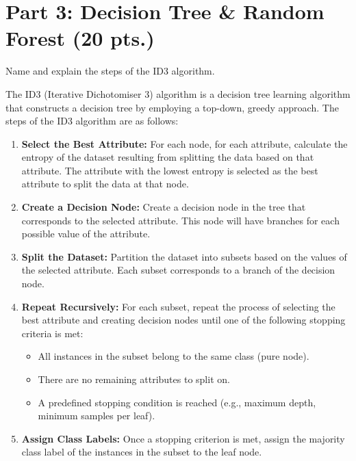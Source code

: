 \documentclass[12pt]{article}
\begin{document}

    \section*{Part 3: Decision Tree \& Random Forest (20 pts.)}

    \begin{ejercicio}
        Name and explain the steps of the ID3 algorithm.

        The ID3 (Iterative Dichotomiser 3) algorithm is a decision tree learning algorithm that constructs a decision tree by employing a top-down, greedy approach. The steps of the ID3 algorithm are as follows:
        \begin{enumerate}
            \item \textbf{Select the Best Attribute:} For each node, for each attribute, calculate the entropy of the dataset resulting from splitting the data based on that attribute. The attribute with the lowest entropy is selected as the best attribute to split the data at that node.
            \item \textbf{Create a Decision Node:} Create a decision node in the tree that corresponds to the selected attribute. This node will have branches for each possible value of the attribute.
            \item \textbf{Split the Dataset:} Partition the dataset into subsets based on the values of the selected attribute. Each subset corresponds to a branch of the decision node.
            \item \textbf{Repeat Recursively:} For each subset, repeat the process of selecting the best attribute and creating decision nodes until one of the following stopping criteria is met:
            \begin{itemize}
                \item All instances in the subset belong to the same class (pure node).
                \item There are no remaining attributes to split on.
                \item A predefined stopping condition is reached (e.g., maximum depth, minimum samples per leaf).
            \end{itemize}
            \item \textbf{Assign Class Labels:} Once a stopping criterion is met, assign the majority class label of the instances in the subset to the leaf node.
        \end{enumerate}
    \end{ejercicio}
\end{document}
